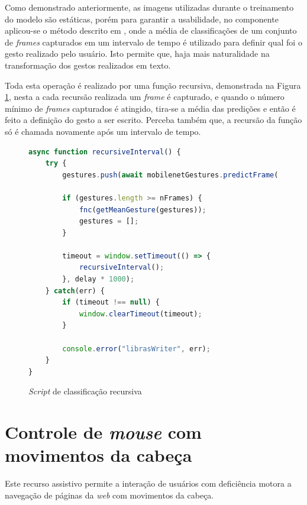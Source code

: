 \par Como demonstrado anteriormente, as imagens utilizadas durante o treinamento do modelo são estáticas, porém para garantir a usabilidade, no componente  aplicou-se o método descrito em \cite{Magalh2018}, onde a média de classificações de um conjunto de \textit{frames} capturados em um intervalo de tempo é utilizado para definir qual foi o gesto realizado pelo usuário. Isto permite que, haja mais naturalidade na transformação dos gestos realizados em texto.

\par Toda esta operação é realizado por uma função recursiva, demonstrada na Figura \ref{figure:funcao_recursiva_de_classificacao}, nesta a cada recursão realizada um \textit{frame} é capturado, e quando o número mínimo de \textit{frames} capturados é atingido, tira-se a média das predições e então é feito a definição do gesto a ser escrito. Perceba também que, a recursão da função só é chamada novamente após um intervalo de tempo.

\begin{figure}[H]
    \centering
    \begin{lstlisting}[language=JavaScript]
async function recursiveInterval() {
    try {
        gestures.push(await mobilenetGestures.predictFrame());

        if (gestures.length >= nFrames) {
            fnc(getMeanGesture(gestures));
            gestures = [];
        }

        timeout = window.setTimeout(() => {
            recursiveInterval();
        }, delay * 1000);       
    } catch(err) {
        if (timeout !== null) {
            window.clearTimeout(timeout);
        }

        console.error("librasWriter", err);
    }
}
    \end{lstlisting}
    \caption{\textit{Script} de classificação recursiva}
    \label{figure:funcao_recursiva_de_classificacao}
\end{figure}

\section{Controle de \textit{mouse} com movimentos da cabeça}

\par Este recurso assistivo permite a interação de usuários com deficiência motora a navegação de páginas da \textit{web} com movimentos da cabeça.

